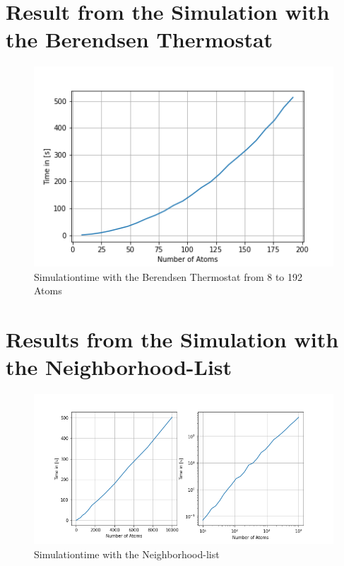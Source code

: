 \section{Result from the Simulation with the Berendsen Thermostat}

\begin{figure}[!h]
	\begin{center}
		\includegraphics[scale=1]{Figure/plotAtomTimes.png}
	\end{center}
	\caption[Simulationtime with the Berendsen Thermostat from 8 to 192 Atoms]{Simulationtime with the Berendsen Thermostat from 8 to 192 Atoms }
	\label{PlotSimulationTimeBerendsenThermostat}
\end{figure}


\section{Results from the Simulation with the Neighborhood-List}

\begin{figure}[!h]
	\begin{center}
		\includegraphics[scale=1.25]{Figure/plotAtomTimesMoreData.png}
	\end{center}
	\caption[Simulationtime with the Neighborhood-list]{Simulationtime with the Neighborhood-list}
	\label{PlotSimulationTimesCutoffNew}
\end{figure}

